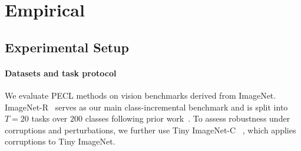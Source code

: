 \documentclass{article}
\theoremstyle{plain}
\theoremstyle{definition}
\theoremstyle{remark}
\begin{document}












\section{Empirical}

\label{sec:results-local-global}





\subsection{Experimental Setup}






\paragraph{Datasets and task protocol}
We evaluate PECL methods on vision benchmarks derived from ImageNet. ImageNet-R~\cite{ImagenetR_Hendrycks_2021_ICCV} serves as our main class-incremental benchmark and is split into $T=20$ tasks over $200$ classes following prior work~\cite{liangInfLoRAInterferenceFreeLowRank2024a}. To assess robustness under corruptions and perturbations, we further use Tiny ImageNet-C ~\cite{hendrycks2018benchmarking}, which applies corruptions to Tiny ImageNet. 
\end{document}
